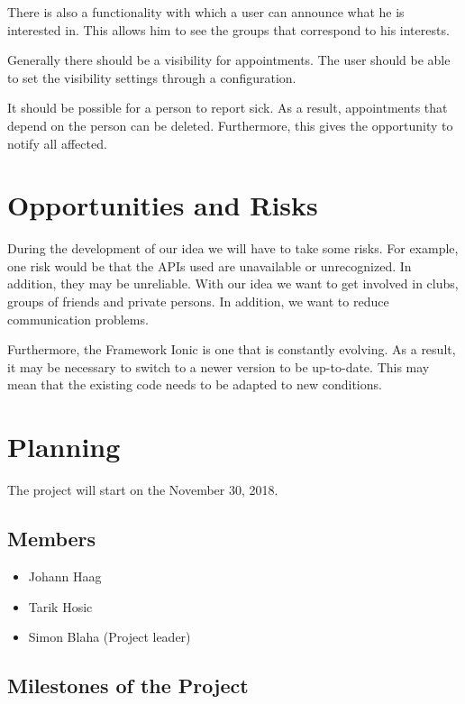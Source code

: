 \documentclass[12pt]{scrartcl}
\begin{document}
        There is also a functionality with which a user can announce what he is interested in.
        This allows him to see the groups that correspond to his interests.
        
        Generally there should be a visibility for appointments.
        The user should be able to set the  visibility settings through a configuration.
        
        It should be possible for a person to report sick. As a result, appointments that depend on the person can be deleted. 
        Furthermore, this gives the opportunity to notify all affected.
    \pagebreak

    \section{Opportunities and Risks}

        During the development of our idea we will have to take some risks. For example, one risk would be that the APIs used are unavailable or unrecognized. In addition, they may be unreliable.
        With our idea we want to get involved in clubs, groups of friends and private persons.
        In addition, we want to reduce communication problems.
       

        Furthermore, the Framework Ionic is one that is constantly evolving. As a result, it may be necessary to switch to a newer version to be up-to-date.
        This may mean that the existing code needs to be adapted to new conditions.
    \pagebreak

    \section{Planning}

    \vspace*{15pt}

    The project will start on the November 30, 2018.

    \subsection{Members}
    \begin{itemize}
        \item Johann Haag
        \item Tarik Hosic
        \item Simon Blaha (Project leader)
    \end{itemize}

    \subsection{Milestones of the Project}
    
\end{document}
